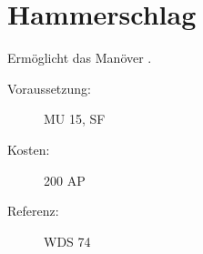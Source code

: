 \section{Hammerschlag}
\label{sf.hammerschlag}
Ermöglicht das Manöver .
\begin{description}
    \item[Voraussetzung:]
        MU 15, SF 
    \item [Kosten:]
        200 AP
    \item [Referenz:]
        WDS 74
\end{description}
